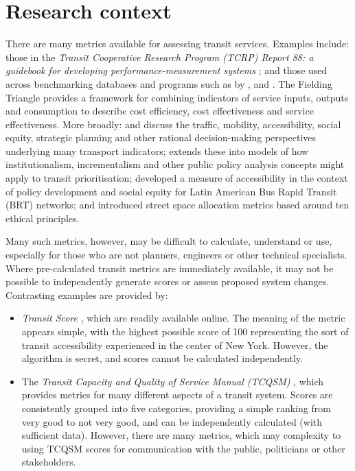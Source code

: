 \documentclass[preprint, 3p,
authoryear]{elsarticle} %
\begin{document}
\section{Research context}\label{research-context}

There are many metrics available for assessing transit services.
Examples include: those in the \emph{Transit Cooperative Research
Program (TCRP) Report 88: a guidebook for developing
performance-measurement systems} \citep{Ryus:2003aa}; and those used
across benchmarking databases and programs such as by
\citet{Florida-Transit-Information-System:2018aa}, \citet{UITP:2015aa}
and \citet{Imperial-College-London:2023aa}. The Fielding Triangle
\citep{FieldingGordonJ1987Mpts} provides a framework for combining
indicators of service inputs, outputs and consumption to describe cost
efficiency, cost effectiveness and service effectiveness. More broadly:
\citet{Litman:2003ab} and \citet{Litman:2016aa} discuss the traffic,
mobility, accessibility, social equity, strategic planning and other
rational decision-making perspectives underlying many transport
indicators; \citet{Reynolds:2017ah} extends these into models of how
institutionalism, incrementalism and other public policy analysis
concepts might apply to transit prioritisation;
\citet{GuzmanLuisA.2017Aeit} developed a measure of accessibility in the
context of policy development and social equity for Latin American Bus
Rapid Transit (BRT) networks; and
\citet{Creutzig2020streetspaceallocation} introduced street space
allocation metrics based around ten ethical principles.

Many such metrics, however, may be difficult to calculate, understand or
use, especially for those who are not planners, engineers or other
technical specialists. Where pre-calculated transit metrics are
immediately available, it may not be possible to independently generate
scores or assess proposed system changes. Contrasting examples are
provided by:

\begin{itemize}
\item
  \emph{Transit Score} \citep{WalkScore:2023tg}, which are readily
  available online. The meaning of the metric appears simple, with the
  highest possible score of 100 representing the sort of transit
  accessibility experienced in the center of New York. However, the
  algorithm is secret, and scores cannot be calculated independently.
\item
  The \emph{Transit Capacity and Quality of Service Manual (TCQSM)}
  \citep{TCQSM:2013}, which provides metrics for many different aspects
  of a transit system. Scores are consistently grouped into five
  categories, providing a simple ranking from very good to not very
  good, and can be independently calculated (with sufficient data).
  However, there are many metrics, which may complexity to using TCQSM
  scores for communication with the public, politicians or other
  stakeholders.
\end{itemize}
\end{document}
